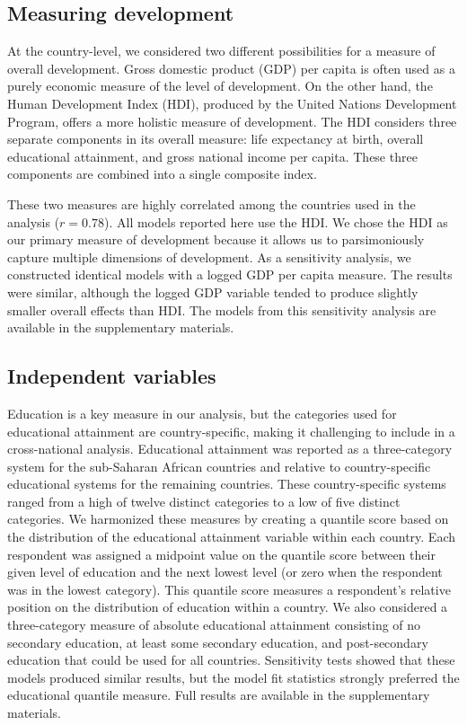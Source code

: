 \documentclass[10pt,letterpaper]{article}
\begin{document}
\subsection*{Measuring development}

At the country-level, we considered two different possibilities for a measure of overall development. Gross domestic product (GDP) per capita is often used as a purely economic measure of the level of development. On the other hand, the Human Development Index (HDI), produced by the United Nations Development Program, offers a more holistic measure of development. The HDI considers three separate components in its overall measure: life expectancy at birth, overall educational attainment, and gross national income per capita. These three components are combined into a single composite index.

These two measures are highly correlated among the countries used in the analysis (\(r=0.78\)). All models reported here use the HDI. We chose the HDI as our primary measure of development because it allows us to parsimoniously capture multiple dimensions of development. As a sensitivity analysis, we constructed identical models with a logged GDP per capita measure. The results were similar, although the logged GDP variable tended to produce slightly smaller overall effects than HDI. The models from this sensitivity analysis are available in the supplementary materials.

\subsection*{Independent variables}

Education is a key measure in our analysis, but the categories used for educational attainment are country-specific, making it challenging to include in a cross-national analysis. Educational attainment was reported as a three-category system for the sub-Saharan African countries and relative to country-specific educational systems for the remaining countries. These country-specific systems ranged from a high of twelve distinct categories to a low of five distinct categories. We harmonized these measures by creating a quantile score based on the distribution of the educational attainment variable within each country. Each respondent was assigned a midpoint value on the quantile score between their given level of education and the next lowest level (or zero when the respondent was in the lowest category). This quantile score measures a respondent's relative position on the distribution of education within a country. We also considered a three-category measure of absolute educational attainment consisting of no secondary education, at least some secondary education, and post-secondary education that could be used for all countries. Sensitivity tests showed that these models produced similar results, but the model fit statistics strongly preferred the educational quantile measure. Full results are available in the supplementary materials.
\end{document}
